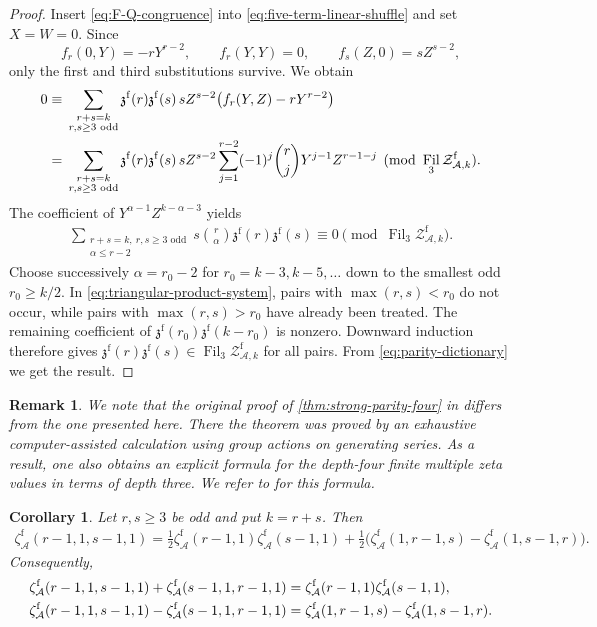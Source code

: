 \documentclass[12pt]{amsart}
\numberwithin{equation}{section}
\theoremstyle{plain}
\newtheorem{cor}[cor]{Corollary}
\newtheorem{rem}[rem]{Remark}
\DeclareMathOperator{\Fil}{Fil}
\newcommand{\ZAfw}[1]{{\mathcal Z_{\mathcal A,#1}^{\mathrm f}}}
\newcommand{\zaf}[1]{\zeta_{\mathcal A}^{\mathrm f}(#1)}
\newcommand{\zzf}[1]{\mathfrak z^{\mathrm f}(#1)}
\begin{document}
\begin{proof}
Insert \eqref{eq:F-Q-congruence} into
\eqref{eq:five-term-linear-shuffle} and set $X=W=0$. Since
\[
 f_r(0,Y)=-rY^{r-2},\qquad f_r(Y,Y)=0,
 \qquad f_s(Z,0)=sZ^{s-2},
\]
only the first and third substitutions survive. We obtain
\begin{align}
0\equiv{}&\sum_{\substack{r+s=k\\r,s\geq3\text{ odd}}}
 \zzf r\zzf s\,sZ^{s-2}\bigl(f_r(Y,Z)-rY^{r-2}\bigr)\notag\\
={}&\sum_{\substack{r+s=k\\r,s\geq3\text{ odd}}}
 \zzf r\zzf s\,sZ^{s-2}
 \sum_{j=1}^{r-2}(-1)^j\binom rjY^{j-1}Z^{r-1-j}
 \pmod{\Fil_3\ZAfw{k}}.
\label{eq:triangular-generating-series}
\end{align}
The coefficient of $Y^{\alpha-1}Z^{k-\alpha-3}$ yields
\begin{align}\label{eq:triangular-product-system}
 \sum_{\substack{r+s=k,\ r,s\geq3\text{ odd}\\\alpha\leq r-2}}
 s\binom r\alpha\zzf r\zzf s\equiv0
 \pmod{\Fil_3\ZAfw{k}}.
\end{align}
Choose successively $\alpha=r_0-2$ for
$r_0=k-3,k-5,\ldots$ down to the smallest odd $r_0\geq k/2$.
In \eqref{eq:triangular-product-system}, pairs with
$\max(r,s)<r_0$ do not occur, while pairs with
$\max(r,s)>r_0$ have already been treated. The remaining coefficient of
$\zzf{r_0}\zzf{k-r_0}$ is nonzero. Downward induction therefore gives
$\zzf r\zzf s\in\Fil_3\ZAfw{k}$ for all pairs. From
\eqref{eq:parity-dictionary} we get the result.
\end{proof}

\begin{rem}
We note that the original proof of \cref{thm:strong-parity-four} in \cite{Risan} differs from the one presented here. There the theorem was proved by an exhaustive computer-assisted calculation using group actions on generating series. As a result, one also obtains an explicit formula for the depth-four finite multiple zeta values in terms of depth three. We refer to \cite{Risan} for this formula.
\end{rem}

\begin{cor}
\label{cor:explicit-true-single-product}
Let $r,s\geq3$ be odd and put $k=r+s$. Then
\begin{align}\label{eq:four-one-product}
 \zaf{r-1,1,s-1,1}
 =\frac12\zaf{r-1,1}\zaf{s-1,1}
  +\frac12\bigl(\zaf{1,r-1,s}-\zaf{1,s-1,r}\bigr).
\end{align}
Consequently,
\begin{align}\label{eq:four-one-symmetry}
 \zaf{r-1,1,s-1,1}+\zaf{s-1,1,r-1,1}
 &=\zaf{r-1,1}\zaf{s-1,1},\\
 \zaf{r-1,1,s-1,1}-\zaf{s-1,1,r-1,1}
 &=\zaf{1,r-1,s}-\zaf{1,s-1,r}.\notag
\end{align}
\end{cor}
\end{document}
